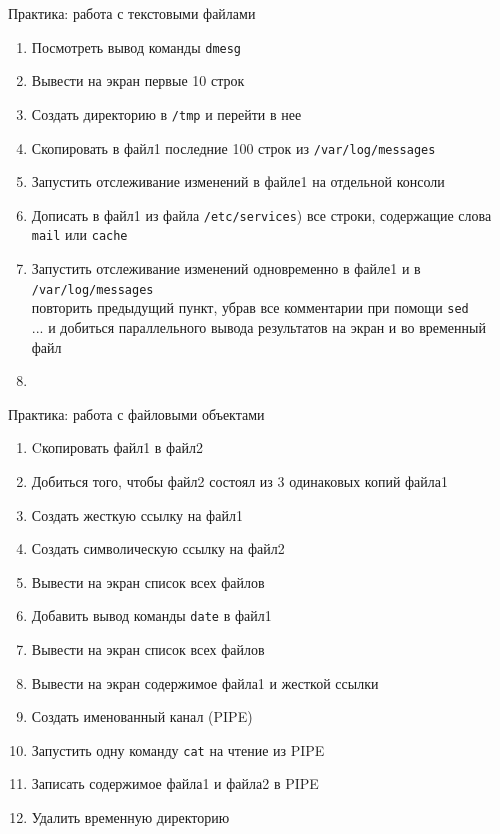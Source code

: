 \documentclass[ignorenonframetext, professionalfonts, hyperref={pdftex, unicode}]{beamer}
\begin{document}
\begin{frame}[fragile]{Практика: работа с текстовыми файлами}
  \begin{enumerate}
	  \item Посмотреть вывод команды {\tt dmesg}
	  \item Вывести на экран первые 10 строк 
		  \pause
	  \item Создать директорию в {\tt /tmp} и перейти в нее
	  \item Скопировать в файл1 последние 100 строк из {\tt /var/log/messages}
	  \item Запустить отслеживание изменений в файле1 на отдельной консоли
	  \item Дописать в файл1 из файла {\tt /etc/services}) все строки,
		  содержащие слова {\tt mail} или {\tt cache}
		  \pause
	  \item Запустить отслеживание изменений одновременно в файле1 и в {\tt /var/log/messages}\\
		  \pause
			повторить предыдущий пункт, убрав все комментарии при помощи {\tt sed}\\
		  \pause
		  ... и добиться параллельного вывода результатов на экран и во временный файл
	  \item
  \end{enumerate}
\end{frame}

\begin{frame}{Практика: работа с файловыми объектами}
	\begin{enumerate}
		\item Cкопировать файл1 в файл2
			\pause
		\item Добиться того, чтобы файл2 состоял из 3 одинаковых копий файла1
		\item Создать жесткую ссылку на файл1
		\item Создать символическую ссылку на файл2
		\item Вывести на экран список всех файлов
			\pause
		\item Добавить вывод команды {\tt date} в файл1
		\item Вывести на экран список всех файлов
		\item Вывести на экран содержимое файла1 и жесткой ссылки
		\item Создать именованный канал (PIPE)
		\item Запустить одну команду {\tt cat} на чтение из PIPE
		\item Записать содержимое файла1 и файла2 в PIPE
		\item Удалить временную директорию
	\end{enumerate}
\end{frame}
\end{document}

